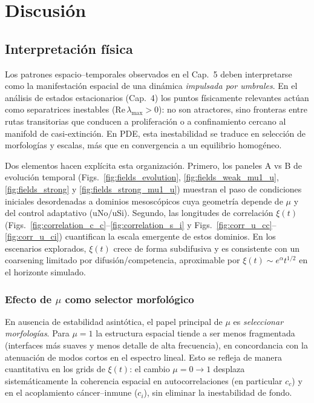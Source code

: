 \chapter{Discusión}
\label{chap:discusion}

\section{Interpretación física}
Los patrones espacio--temporales observados en el Cap.~5 deben interpretarse como la manifestación espacial de una dinámica \emph{impulsada por umbrales}. En el análisis de estados estacionarios (Cap.~4) los puntos físicamente relevantes actúan como separatrices inestables (Re\,$\lambda_{\max}>0$): no son atractores, sino fronteras entre rutas transitorias que conducen a proliferación o a confinamiento cercano al manifold de casi-extinción. En PDE, esta inestabilidad se traduce en selección de morfologías y escalas, más que en convergencia a un equilibrio homogéneo.

Dos elementos hacen explícita esta organización. Primero, los paneles A vs B de evolución temporal (Figs.~\ref{fig:fields_evolution}, \ref{fig:fields_weak_mu1_u}, \ref{fig:fields_strong} y \ref{fig:fields_strong_mu1_u}) muestran el paso de condiciones iniciales desordenadas a dominios mesoscópicos cuya geometría depende de $\mu$ y del control adaptativo (uNo/uSi). Segundo, las longitudes de correlación $\xi(t)$ (Figs.~\ref{fig:correlation_c_c}--\ref{fig:correlation_s_i} y Figs.~\ref{fig:corr_u_cc}--\ref{fig:corr_u_ci}) cuantifican la escala emergente de estos dominios. En los escenarios explorados, $\xi(t)$ crece de forma subdifusiva y es consistente con un coarsening limitado por difusión/competencia, aproximable por $\xi(t)\sim e^{\alpha}t^{1/2}$ en el horizonte simulado.

\subsection{Efecto de $\mu$ como selector morfológico}
En ausencia de estabilidad asintótica, el papel principal de $\mu$ es \emph{seleccionar morfologías}. Para $\mu=1$ la estructura espacial tiende a ser menos fragmentada (interfaces más suaves y menos detalle de alta frecuencia), en concordancia con la atenuación de modos cortos en el espectro lineal. Esto se refleja de manera cuantitativa en los grids de $\xi(t)$: el cambio $\mu=0\to 1$ desplaza sistemáticamente la coherencia espacial en autocorrelaciones (en particular $c_c$) y en el acoplamiento cáncer--inmune ($c_i$), sin eliminar la inestabilidad de fondo.

